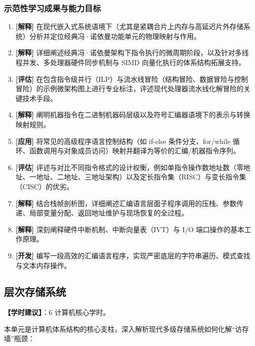 \subsubsection{示范性学习成果与能力目标}
\begin{enumerate}
    \item \textbf{[解释]} 在现代嵌入式系统语境下（尤其是紧耦合片上内存与高延迟片外存储系统）分析并定位经典冯·诺依曼功能单元的物理映射与作用。
    \item \textbf{[解释]} 详细阐述经典冯·诺依曼架构下指令执行的微周期阶段，以及针对多线程并发、多处理器硬件同步机制与 SIMD 向量化执行的体系结构拓展支持。
    \item \textbf{[评估]} 在包含指令级并行（ILP）与流水线冒险（结构冒险、数据冒险与控制冒险）的示例微架构图上进行专业标注，评述现代处理器流水线化解冒险的关键技术手段。
    \item \textbf{[解释]} 阐明机器指令在二进制机器码层级以及符号汇编器语境下的表示与转换映射规则。
    \item \textbf{[应用]} 将常见的高级程序语言控制结构（如 if-else 条件分支、for/while 循环、函数调用与对象成员访问）映射并翻译为等价的汇编/机器指令序列。
    \item \textbf{[评估]} 评述与对比不同指令格式的设计权衡，例如单指令操作数地址数（零地址、一地址、二地址、三地址架构）以及定长指令集（RISC）与变长指令集（CISC）的优劣。
    \item \textbf{[解释]} 结合栈帧剖析图，详细阐述汇编语言层面子程序调用的压栈、参数传递、局部变量分配、返回地址维护与现场恢复的全过程。
    \item \textbf{[解释]} 深刻阐释硬件中断机制、中断向量表（IVT）与 I/O 端口操作的基本工作原理。
    \item \textbf{[开发]} 编写一段高效的汇编语言程序，实现严密底层的字符串遍历、模式查找与文本内存操作。
\end{enumerate}

\subsection{层次存储系统}
\textbf{【学时建议】}：6 计算机核心学时。

本单元是计算机体系结构的核心支柱，深入解析现代多级存储系统如何化解“访存墙”瓶颈：

